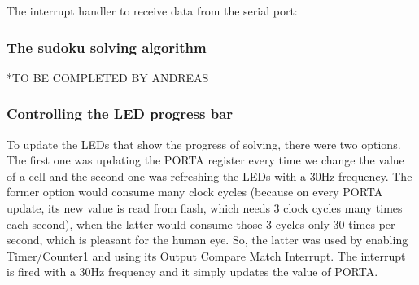 \documentclass[12pt, a4]{article}
\begin{document}
The interrupt handler to receive data from the serial port:
\begin{center}
\end{center}			 

\subsubsection*{The sudoku solving algorithm}
*TO BE COMPLETED BY ANDREAS

\subsubsection*{Controlling the LED progress bar}
To update the LEDs that show the progress of solving, there were two options. The first one was updating the PORTA register every time we change the value of a cell and the second one was refreshing the LEDs with a 30Hz frequency. The former option would consume many clock cycles (because on every PORTA update, its new value is read from flash, which needs 3 clock cycles many times each second), when the latter would consume those 3 cycles only 30 times per second, which is pleasant for the human eye. So, the latter was used by enabling Timer/Counter1 and using its Output Compare Match Interrupt. The interrupt is fired with a 30Hz frequency and it simply updates the value of PORTA.
\end{document}
